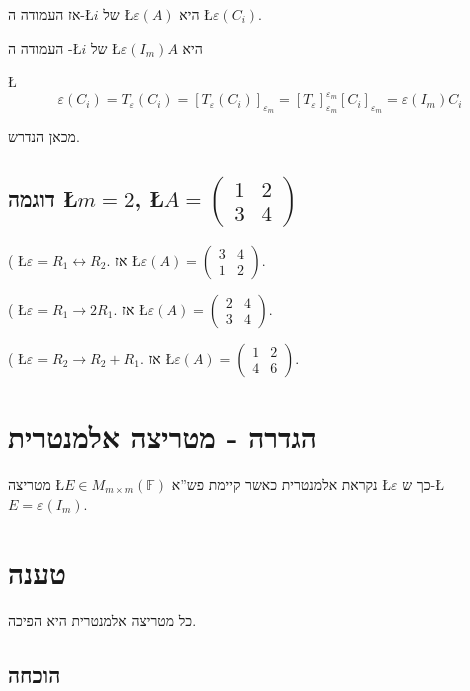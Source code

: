 \documentclass[english,hebrew]{article}
\begin{document}
אז העמודה ה-\L{$i$} של \L{$\varepsilon(A)$} היא \L{$\varepsilon(C_{i})$}.

העמודה ה -\L{$i$} של \L{$\varepsilon(I_{m})A$} היא 

\L{%
\[
\varepsilon(C_{i})=T_{\varepsilon}(C_{i})=[T_{\varepsilon}(C_{i})]_{\varepsilon_{m}}=[T_{\varepsilon}]_{\varepsilon_{m}}^{\varepsilon_{m}}[C_{i}]_{\varepsilon_{m}}=\varepsilon(I_{m})C_{i}
\]
}%

מכאן הנדרש.

\subsection{דוגמה\qquad{} \L{$m=2$}, \L{$A=\begin{pmatrix}1 & 2\\
3 & 4
\end{pmatrix}$}}

{\endL}( \L{$\varepsilon=R_{1}\leftrightarrow R_{2}$}. אז
\L{$\varepsilon(A)=\begin{pmatrix}3 & 4\\
1 & 2
\end{pmatrix}$}.

{\endL}( \L{$\varepsilon=R_{1}\rightarrow2R_{1}$}. אז \L{$\varepsilon(A)=\begin{pmatrix}2 & 4\\
3 & 4
\end{pmatrix}$}.

{\endL}( \L{$\varepsilon=R_{2}\rightarrow R_{2}+R_{1}$}.
אז \L{$\varepsilon(A)=\begin{pmatrix}1 & 2\\
4 & 6
\end{pmatrix}$}.

\section{הגדרה - מטריצה אלמנטרית}

מטריצה \L{$E\in M_{m\times m}(\mathbb{F})$} נקראת אלמנטרית כאשר קיימת
פש\textquotedblright א \L{$\varepsilon$} כך ש-\L{$E=\varepsilon(I_{m})$}.

\section{טענה}

כל מטריצה אלמנטרית היא הפיכה.

\subsection{הוכחה}
\end{document}
